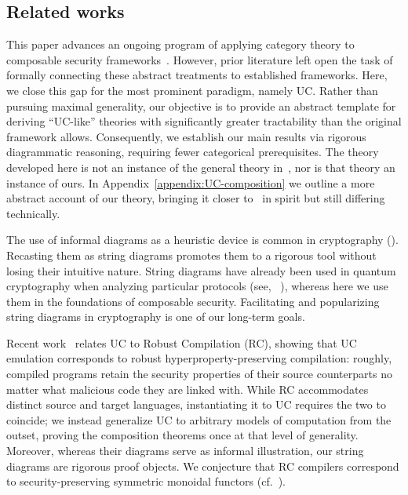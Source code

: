 \subsection*{Related works} This paper advances an ongoing program of applying category theory to composable security frameworks~\cite{BK22,BK23}. However, prior literature left open the task of formally connecting these abstract treatments to established frameworks. Here, we close this gap for the most prominent paradigm, namely UC. Rather than pursuing maximal generality, our objective is to provide an abstract template for deriving ``UC-like'' theories with significantly greater tractability than the original framework allows. Consequently, we establish our main results via rigorous diagrammatic reasoning, requiring fewer categorical prerequisites. The theory developed here is not an instance of the general theory in~\cite{BK23}, nor is that theory an instance of ours. In Appendix~\ref{appendix:UC-composition} we outline a more abstract account of our theory, bringing it closer to~\cite{BK23} in spirit but still differing technically.

The use of informal diagrams as a heuristic device is common in cryptography (\eg \cite{PR08,joyofcryptography,BDF+18,BO23SSP}). Recasting them as string diagrams promotes them to a rigorous tool without losing their intuitive nature. String diagrams have already been used in quantum cryptography when analyzing particular protocols (see,  \eg~\cite{breiner:graphicaldicrypto,coecke:graphicalqkd,breiner:selftesting,hillebrand:superdense,stay:crypto,colissonetal:graphstate}), whereas here we use them in the foundations of composable security. Facilitating and popularizing string diagrams in cryptography is one of our long-term goals. 

Recent work~\cite{PKWC24:UCisRC,KPC24:robustcompilationandUC} relates UC to Robust Compilation (RC), showing that UC emulation corresponds to robust hyperproperty-preserving compilation: roughly, compiled programs retain the security properties of their source counterparts no matter what malicious code they are linked with. While RC accommodates distinct source and target languages, instantiating it to UC requires the two to coincide; we instead generalize UC to arbitrary models of computation from the outset, proving the composition theorems once at that level of generality. Moreover, whereas their diagrams serve as informal illustration, our string diagrams are rigorous proof objects. We conjecture that RC compilers correspond to security-preserving symmetric monoidal functors (cf.~\cite[Theorem~4.10]{BK23}).

